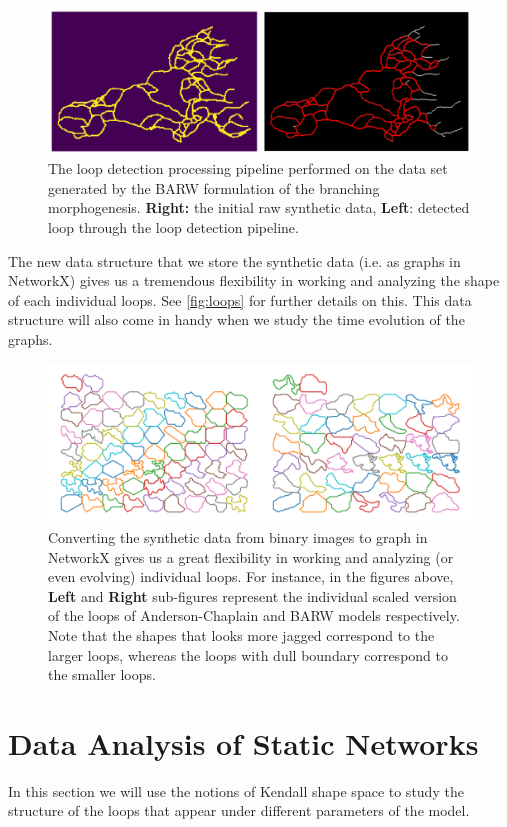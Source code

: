 \documentclass[10pt,a4paper,twocolumn]{article}
\begin{document}
	\begin{figure}[h!]
		\centering
		\includegraphics[width=1\linewidth]{images/BARWProc}
		\caption{The loop detection processing pipeline performed on the data set generated by the BARW formulation of the branching morphogenesis. \textbf{Right:} the initial raw synthetic data, \textbf{Left}: detected loop through the loop detection pipeline.}
		\label{fig:barwproc}
	\end{figure}
	
	The new data structure that we store the synthetic data (i.e. as graphs in NetworkX) gives us a tremendous flexibility in working and analyzing the shape of each individual loops. See \autoref{fig:loops} for further details on this. This data structure will also come in handy when we study the time evolution of the graphs.
	\begin{figure}[h!]
		\centering
		\includegraphics[width=1\linewidth]{images/loops.png}
		\caption{Converting the synthetic data from binary images to graph in NetworkX gives us a great flexibility in working and analyzing (or even evolving) individual loops. For instance, in the figures above, \textbf{Left} and \textbf{Right} sub-figures represent the individual scaled version of the loops of Anderson-Chaplain and BARW models respectively. Note that the shapes that looks more jagged correspond to the larger loops, whereas the loops with dull boundary correspond to the smaller loops.}
		\label{fig:loops}
	\end{figure}
	\section{Data Analysis of Static Networks}
	In this section we will use the notions of Kendall shape space to study the structure of the loops that appear under different parameters of the model.
	
\end{document}
